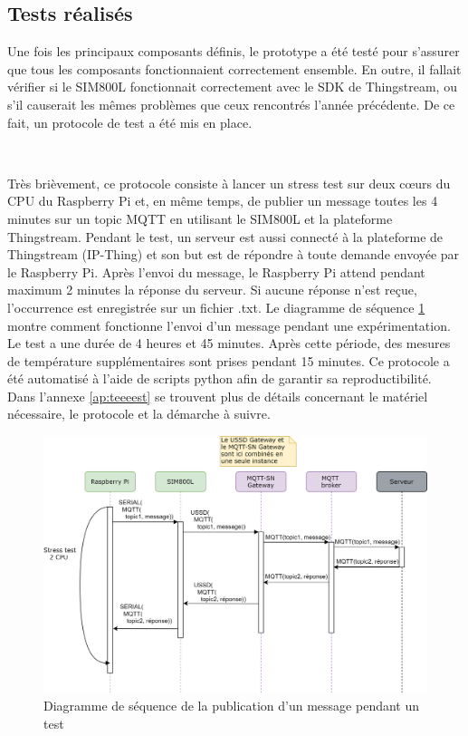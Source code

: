 \subsection{Tests réalisés}
\label{sec:prototests}

\noindent
Une fois les principaux composants définis, le prototype a été testé pour s'assurer que tous les composants fonctionnaient correctement ensemble. En outre, il fallait vérifier si le SIM800L fonctionnait correctement avec le SDK de Thingstream, ou s'il causerait les mêmes problèmes que ceux rencontrés l'année précédente. De ce fait, un protocole de test a été mis en place.

~

\noindent
Très brièvement, ce protocole consiste à lancer un stress test sur deux cœurs du CPU du Raspberry Pi et, en même temps, de publier un message toutes les 4 minutes sur un topic MQTT en utilisant le SIM800L et la plateforme Thingstream. Pendant le test, un serveur est aussi connecté à la plateforme de Thingstream (IP-Thing) et son but est de répondre à toute demande envoyée par le Raspberry Pi. Après l'envoi du message, le Raspberry Pi attend pendant maximum 2 minutes la réponse du serveur. Si aucune réponse n'est reçue, l'occurrence est enregistrée sur un fichier .txt. Le diagramme de séquence \ref{fig:dia_test} montre comment fonctionne l'envoi d'un message pendant une expérimentation. Le test a une durée de 4 heures et 45 minutes. Après cette période, des mesures de température supplémentaires sont prises pendant 15 minutes. Ce protocole a été automatisé à l'aide de scripts python afin de garantir sa reproductibilité. Dans l'annexe \ref{ap:teeeest} se trouvent plus de détails concernant le matériel nécessaire, le protocole et la démarche à suivre.

\begin{figure}[ht!]
  \includegraphics[width=\textwidth]{img/el_prototype/diagram_test.png}
  \caption{Diagramme de séquence de la publication d'un message pendant un test}
  \label{fig:dia_test}
\end{figure}


